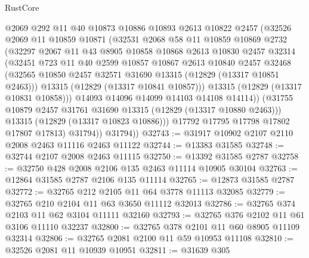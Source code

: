 \begin{lexlean}{RustCore}
\begin{coremodule}
                @2069
                @292
                @11
                @40
                @10873
                @10886
                @10893
                @2613
                @10822
                @2457
                (@32526
                  @2069
                  @11
                  @10859
                  @10871
                  (@32531
                    @2068
                    @58
                    @11
                    @10859
                    @10869
                    @2732
                    (@32297
                      @2067
                      @11
                      @43
                      @8905
                      @10858
                      @10868
                      @2613
                      @10830
                      @2457
                      @32314
                      (@32451
                        @723
                        @11
                        @40
                        @2599
                        @10857
                        @10867
                        @2613
                        @10840
                        @2457
                        @32468
                        (@32565 @10850 @2457 @32571 @31690 @13315 (@12829 (@13317 @10851 @2463)))
                        @13315
                        (@12829 (@13317 @10841 @10857)))
                      @13315
                      (@12829 (@13317 @10831 @10858)))
                    @14093
                    @14096
                    @14099
                    @14103
                    @14108
                    @14114))
                (@31755 @10879 @2457 @31761 @31690 @13315 (@12829 (@13317 @10880 @2463)))
                @13315
                (@12829 (@13317 @10823 @10886)))
              @17792
              @17795
              @17798
              @17802
              @17807
              @17813)
            @31794))
        @31794))
@32743 := @31917 @10902 @2107 @2110 @2008 @2463 @11116 @2463 @11122
@32744 := @13383 @31585
@32748 := @32744 @2107 @2008 @2463 @11115
@32750 := @13392 @31585 @2787
@32758 := @32750 @428 @2008 @2106 @135 @2463 @11114 @10905 @30104
@32763 := @12864 @31585 @2787 @2106 @135 @11114
@32765 := @12873 @31585 @2787
@32772 := @32765 @212 @2105 @11 @64 @3778 @11113 @32085
@32779 := @32765 @210 @2104 @11 @63 @3650 @11112 @32013
@32786 := @32765 @374 @2103 @11 @62 @3104 @11111 @32160
@32793 := @32765 @376 @2102 @11 @61 @3106 @11110 @32237
@32800 := @32765 @378 @2101 @11 @60 @8905 @11109 @32314
@32806 := @32765 @2081 @2100 @11 @59 @10953 @11108
@32810 := @32526 @2081 @11 @10939 @10951
@32811 := @31639 @305

\end{coremodule}
\end{lexlean}

